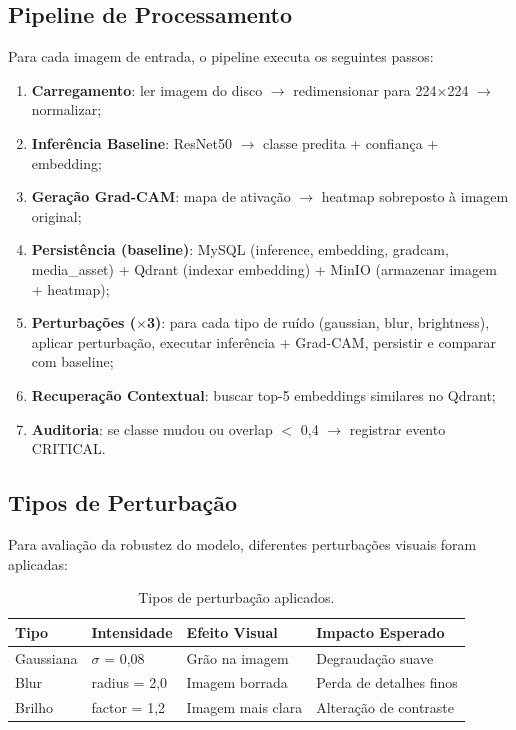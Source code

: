 \documentclass[12pt,a4paper,twoside]{article}
\begin{document}
\subsection{Pipeline de Processamento}

Para cada imagem de entrada, o pipeline executa os seguintes passos:

\begin{enumerate}
    \item \textbf{Carregamento}: ler imagem do disco $\rightarrow$ redimensionar para 224$\times$224 $\rightarrow$ normalizar;
    \item \textbf{Inferência Baseline}: ResNet50 $\rightarrow$ classe predita + confiança + embedding;
    \item \textbf{Geração Grad-CAM}: mapa de ativação $\rightarrow$ heatmap sobreposto à imagem original;
    \item \textbf{Persistência (baseline)}: MySQL (inference, embedding, gradcam, media\_asset) + Qdrant (indexar embedding) + MinIO (armazenar imagem + heatmap);
    \item \textbf{Perturbações ($\times$3)}: para cada tipo de ruído (gaussian, blur, brightness), aplicar perturbação, executar inferência + Grad-CAM, persistir e comparar com baseline;
    \item \textbf{Recuperação Contextual}: buscar top-5 embeddings similares no Qdrant;
    \item \textbf{Auditoria}: se classe mudou ou overlap $<$ 0,4 $\rightarrow$ registrar evento CRITICAL.
\end{enumerate}

\subsection{Tipos de Perturbação}

Para avaliação da robustez do modelo, diferentes perturbações visuais foram aplicadas:

\begin{table}[H]
\centering
\caption{Tipos de perturbação aplicados.}
\label{tab:perturbacoes}
\begin{tabular}{@{}llll@{}}
\toprule
\textbf{Tipo} & \textbf{Intensidade} & \textbf{Efeito Visual} & \textbf{Impacto Esperado} \\
\midrule
Gaussiana & $\sigma$ = 0,08 & Grão na imagem & Degraudação suave \\
Blur & radius = 2,0 & Imagem borrada & Perda de detalhes finos \\
Brilho & factor = 1,2 & Imagem mais clara & Alteração de contraste \\
\bottomrule
\end{tabular}
\end{table}
\end{document}
